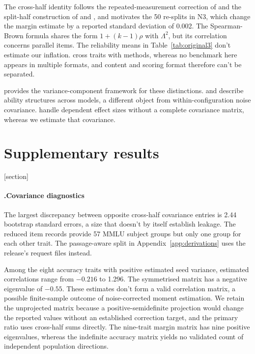 The cross-half identity follows the repeated-measurement correction of \citet{spearman1904} and the split-half construction of \citet{spearman1910} and \citet{brown1910}, and \citet{cronbach1951} motivates the 50 re-splits in N3, which change the margin estimate by a reported standard deviation of 0.002. The Spearman-Brown formula shares the form $1+(k-1)\rho$ with $\Lambda^2$, but its correlation concerns parallel items. The reliability means in Table~\ref{tab:original3} don't estimate our inflation. \citet{campbell1959} cross traits with methods, whereas no benchmark here appears in multiple formats, and content and scoring format therefore can't be separated.

\citet{brennan2001} provides the variance-component framework for these distinctions. \citet{hofmann2025} and \citet{kipnis2024} describe ability structures across models, a different object from within-configuration noise covariance. \citet{hedges2010} handle dependent effect sizes without a complete covariance matrix, whereas we estimate that covariance.
\section{Supplementary results}
\label{app:supplementary}
[section]\renewcommand{\thecpar}{\thesection.\arabic{cpar}}
\newcommand{\cparagraph}[1]{\paragraph{\thecpar\quad #1}}

\cparagraph{Covariance diagnostics}
The largest discrepancy between opposite cross-half covariance entries is 2.44 bootstrap standard errors, a size that doesn't by itself establish leakage. The reduced item records provide 57 MMLU subject groups but only one group for each other trait. The passage-aware split in Appendix~\ref{app:derivations} uses the release's request files instead.

Among the eight accuracy traits with positive estimated seed variance, estimated correlations range from $-0.216$ to 1.296. The symmetrised matrix has a negative eigenvalue of $-0.55$. These estimates don't form a valid correlation matrix, a possible finite-sample outcome of noise-corrected moment estimation. We retain the unprojected matrix because a positive-semidefinite projection would change the reported values without an established correction target, and the primary ratio uses cross-half sums directly. The nine-trait margin matrix has nine positive eigenvalues, whereas the indefinite accuracy matrix yields no validated count of independent population directions.

